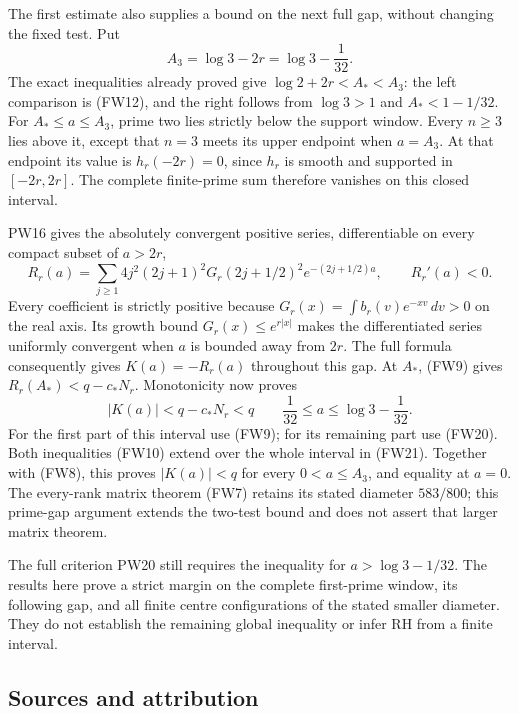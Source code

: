 \documentclass[
  10pt,
  a4paper,
]{article}
\begin{document}
The first estimate also supplies a bound on the next full gap, without
changing the fixed test. Put \[
A_3=\log3-2r=\log3-\frac1{32}.
\tag{FW19}
\] The exact inequalities already proved give \(\log2+2r<A_*<A_3\): the
left comparison is (FW12), and the right follows from \(\log3>1\) and
\(A_*<1-1/32\). For \(A_*\le a\le A_3\), prime two lies strictly below
the support window. Every \(n\ge3\) lies above it, except that \(n=3\)
meets its upper endpoint when \(a=A_3\). At that endpoint its value is
\(h_r(-2r)=0\), since \(h_r\) is smooth and supported in \([-2r,2r]\).
The complete finite-prime sum therefore vanishes on this closed
interval.

PW16 gives the absolutely convergent positive series, differentiable on
every compact subset of \(a>2r\), \[
R_r(a)=\sum_{j\ge1}4j^2(2j+1)^2
G_r(2j+1/2)^2e^{-(2j+1/2)a},\qquad R_r'(a)<0.
\tag{FW20}
\] Every coefficient is strictly positive because
\(G_r(x)=\int b_r(v)e^{-xv}\,dv>0\) on the real axis. Its growth bound
\(G_r(x)\le e^{r|x|}\) makes the differentiated series uniformly
convergent when \(a\) is bounded away from \(2r\). The full formula
consequently gives \(K(a)=-R_r(a)\) throughout this gap. At \(A_*\),
(FW9) gives \(R_r(A_*)<q-c_*N_r\). Monotonicity now proves \[
\boxed{|K(a)|<q-c_*N_r<q\qquad
\frac1{32}\le a\le\log3-\frac1{32}.}
\tag{FW21}
\] For the first part of this interval use (FW9); for its remaining part
use (FW20). Both inequalities (FW10) extend over the whole interval in
(FW21). Together with (FW8), this proves \(|K(a)|<q\) for every
\(0<a\le A_3\), and equality at \(a=0\). The every-rank matrix theorem
(FW7) retains its stated diameter \(583/800\); this prime-gap argument
extends the two-test bound and does not assert that larger matrix
theorem.

The full criterion PW20 still requires the inequality for
\(a>\log3-1/32\). The results here prove a strict margin on the complete
first-prime window, its following gap, and all finite centre
configurations of the stated smaller diameter. They do not establish the
remaining global inequality or infer RH from a finite interval.

\subsection{Sources and attribution}\label{sources-and-attribution}
\end{document}
